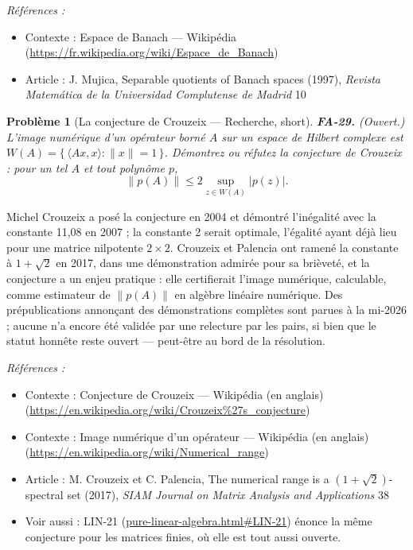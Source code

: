 \documentclass[11pt]{article}
\newtheorem{problem}{Problème}
\newenvironment{refs}{\par\small\noindent\emph{Références :}\begin{itemize}\setlength\itemsep{0pt}}{\end{itemize}\normalsize}
\begin{document}
\begin{refs}
\item Contexte : Espace de Banach --- Wikipédia (\url{https://fr.wikipedia.org/wiki/Espace_de_Banach})
\item Article : J. Mujica, \og{} Separable quotients of Banach spaces \fg{} (1997), \textit{Revista Matemática de la Universidad Complutense de Madrid} 10
\end{refs}

\bigskip

\begin{problem}[{La conjecture de Crouzeix --- Recherche, short}]
\textbf{FA-29.} (Ouvert.) L'\textit{image numérique} d'un opérateur borné $ A $ sur
un espace de Hilbert complexe est
$ W(A) = \{\, \langle Ax, x\rangle : \|x\| = 1 \,\} $. Démontrez ou réfutez la conjecture de Crouzeix :
pour un tel $ A $ et tout polynôme $ p $,
\[ \|p(A)\| \le 2 \sup_{z \in W(A)} |p(z)| . \]
\end{problem}

\noindent Michel Crouzeix a posé la conjecture en 2004 et démontré l'inégalité avec la constante
11,08 en 2007 ; la constante 2 serait optimale, l'égalité ayant déjà lieu pour une matrice nilpotente
$ 2 \times 2 $. Crouzeix et Palencia ont ramené la constante à $ 1 + \sqrt{2} $ en 2017, dans une
démonstration admirée pour sa brièveté, et la conjecture a un enjeu pratique : elle certifierait l'image
numérique, calculable, comme estimateur de $ \|p(A)\| $ en algèbre linéaire numérique. Des prépublications
annonçant des démonstrations complètes sont parues à la mi-2026 ; aucune n'a encore été validée par une
relecture par les pairs, si bien que le statut honnête reste ouvert --- peut-être au bord de la
résolution.

\begin{refs}
\item Contexte : Conjecture de Crouzeix --- Wikipédia (en anglais) (\url{https://en.wikipedia.org/wiki/Crouzeix%27s_conjecture})
\item Contexte : Image numérique d'un opérateur --- Wikipédia (en anglais) (\url{https://en.wikipedia.org/wiki/Numerical_range})
\item Article : M. Crouzeix et C. Palencia, \og{} The numerical range is a $ (1+\sqrt 2) $-spectral set \fg{} (2017), \textit{SIAM Journal on Matrix Analysis and Applications} 38
\item Voir aussi : LIN-21 (\url{pure-linear-algebra.html#LIN-21}) énonce la même conjecture pour les matrices finies, où elle est tout aussi ouverte.
\end{refs}
\end{document}
